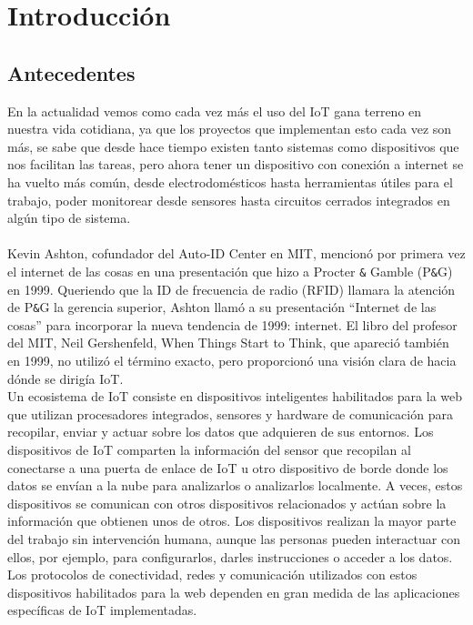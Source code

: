 \documentclass[12pt]{book}
\begin{document}
\chapter{Introducción}
\section{Antecedentes}
En la actualidad vemos como cada vez más el uso del IoT gana terreno en nuestra vida cotidiana, ya que los proyectos que implementan esto cada vez son más, se sabe que desde hace tiempo existen tanto sistemas como dispositivos que nos facilitan las tareas, pero ahora tener un dispositivo con conexión a internet se ha vuelto más común, desde electrodomésticos hasta herramientas útiles para el trabajo, poder monitorear desde sensores hasta circuitos cerrados integrados en algún tipo de sistema. \\
\\
Kevin Ashton, cofundador del Auto-ID Center en MIT, mencionó por primera vez el internet de las cosas en una presentación que hizo a Procter \verb|&| Gamble (P\verb|&|G) en 1999. Queriendo que la ID de frecuencia de radio (RFID) llamara la atención de P\verb*|&|G la gerencia superior, Ashton llamó a su presentación “Internet de las cosas” para incorporar la nueva tendencia de 1999: internet. El libro del profesor del MIT, Neil Gershenfeld, When Things Start to Think, que apareció también en 1999, no utilizó el término exacto, pero proporcionó una visión clara de hacia dónde se dirigía IoT. \\

Un ecosistema de IoT consiste en dispositivos inteligentes habilitados para la web que utilizan procesadores integrados, sensores y hardware de comunicación para recopilar, enviar y actuar sobre los datos que adquieren de sus entornos. Los dispositivos de IoT comparten la información del sensor que recopilan al conectarse a una puerta de enlace de IoT u otro dispositivo de borde donde los datos se envían a la nube para analizarlos o analizarlos localmente. A veces, estos dispositivos se comunican con otros dispositivos relacionados y actúan sobre la información que obtienen unos de otros. Los dispositivos realizan la mayor parte del trabajo sin intervención humana, aunque las personas pueden interactuar con ellos, por ejemplo, para configurarlos, darles instrucciones o acceder a los datos.
Los protocolos de conectividad, redes y comunicación utilizados con estos dispositivos habilitados para la web dependen en gran medida de las aplicaciones específicas de IoT implementadas.
\vspace{10cm}
\end{document}
